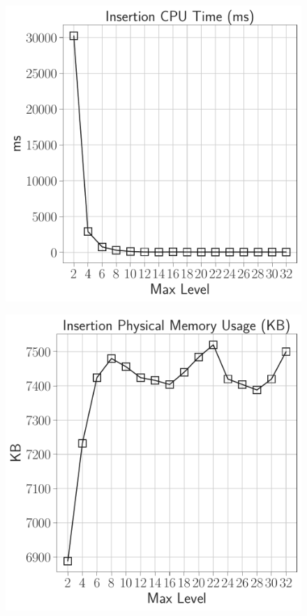 \documentclass[12pt]{article}
\begin{document}
\begin{figure}[H]
	\centering
	\begin{minipage}{0.32\textwidth}
		\centering
		\includegraphics[width=\linewidth]{../notebook/plot/sl_maxlevel_insertion_cpu_time_(ms).pdf}
		\label{fig:cpu_time}
	\end{minipage}\hfill
	\begin{minipage}{0.32\textwidth}
		\centering
		\includegraphics[width=\linewidth]{../notebook/plot/sl_maxlevel_insertion_physical_memory_usage_(kb).pdf}

\end{minipage}
\end{figure}
\end{document}
